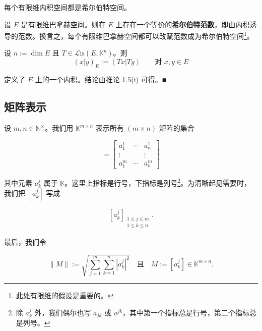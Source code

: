 \begin{remark}
\begin{items}
\item

每个有限维内积空间都是希尔伯特空间。

\item

设 $ E $ 是有限维巴拿赫空间。则在 $ E $ 上存在一个等价的\textbf{希尔伯特范数}，即由内积诱导的范数。换言之，每个有限维巴拿赫空间都可以改赋范数成为希尔伯特空间\footnote{此处有限维的假设是重要的。}。

\proofhead
设 $ n := \dim E $ 且 $ T \in \mathcal{L}\mathrm{is}(E, \mathbb{K}^{n}) $。则
\[
(x|y)_{E} := (Tx|Ty) \qquad \text{对 } x, y \in E
\]

定义了 $ E $ 上的一个内积。结论由推论 1.5(i) 可得。\nobreak\hspace{0.35em}■

\end{items}

\end{remark}

\subsection*{矩阵表示}

设 $ m, n \in \mathbb{N}^{\times} $。我们用 $ \mathbb{K}^{m \times n} $ 表示所有 $ (m \times n) $ 矩阵的集合

\begin{equation*}
[a_{k}^{j}] = \begin{bmatrix} a_{1}^{1} & \cdots & a_{n}^{1} \\ \vdots & & \vdots \\ a_{1}^{m} & \cdots & a_{n}^{m} \end{bmatrix}
\end{equation*}

其中元素 $ a_{k}^{j} $ 属于 $ \mathbb{K} $。这里上指标是行号，下指标是列号\footnote{除 $ a_{k}^{j} $ 外，我们偶尔也写 $ a_{jk} $ 或 $ a^{jk} $，其中第一个指标总是行号，第二个指标总是列号。}。为清晰起见需要时，我们把 $ [a_{k}^{j}] $ 写成

\begin{equation*}
\begin{aligned}
[a_{k}^{j}]_{\substack{1 \le j \le m \\ 1 \le k \le n}} .
\end{aligned}
\end{equation*}

最后，我们令

\begin{equation}
\|M\| := \sqrt{\sum_{j=1}^{m}\sum_{k=1}^{n} |a_{k}^{j}|^{2}} \quad \text{且} \quad M := [a_{k}^{j}] \in \mathbb{K}^{m \times n} .\tag{1.4}
\end{equation}

